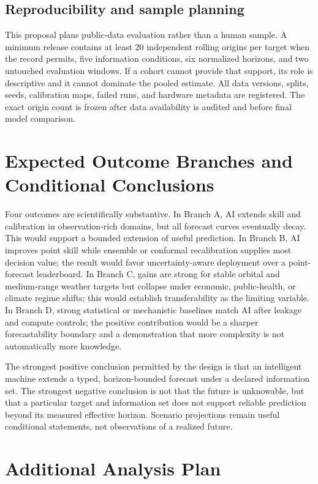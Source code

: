 \documentclass[conference]{IEEEtran}
\begin{document}
\subsection{Reproducibility and sample planning}
This proposal plans public-data evaluation rather than a human sample. A minimum release contains at least 20 independent rolling origins per target when the record permits, five information conditions, six normalized horizons, and two untouched evaluation windows. If a cohort cannot provide that support, its role is descriptive and it cannot dominate the pooled estimate. All data versions, splits, seeds, calibration maps, failed runs, and hardware metadata are registered. The exact origin count is frozen after data availability is audited and before final model comparison.

\section{Expected Outcome Branches and Conditional Conclusions}
Four outcomes are scientifically substantive. In Branch A, AI extends skill and calibration in observation-rich domains, but all forecast curves eventually decay. This would support a bounded extension of useful prediction. In Branch B, AI improves point skill while ensemble or conformal recalibration supplies most decision value; the result would favor uncertainty-aware deployment over a point-forecast leaderboard. In Branch C, gains are strong for stable orbital and medium-range weather targets but collapse under economic, public-health, or climate regime shifts; this would establish transferability as the limiting variable. In Branch D, strong statistical or mechanistic baselines match AI after leakage and compute controls; the positive contribution would be a sharper forecastability boundary and a demonstration that more complexity is not automatically more knowledge.

The strongest positive conclusion permitted by the design is that an intelligent machine extends a typed, horizon-bounded forecast under a declared information set. The strongest negative conclusion is not that the future is unknowable, but that a particular target and information set does not support reliable prediction beyond its measured effective horizon. Scenario projections remain useful conditional statements, not observations of a realized future.

\section{Additional Analysis Plan}
\end{document}
